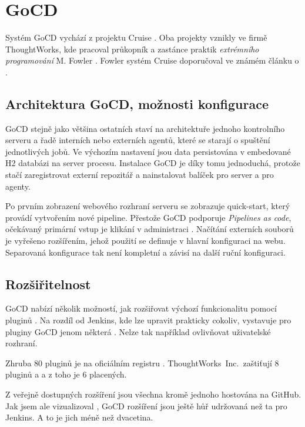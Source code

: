 \section{GoCD}
    Systém GoCD vychází z projektu Cruise \cite{thoughtworks-gocd}. Oba projekty vznikly ve firmě ThoughtWorks, kde pracoval průkopník a zastánce praktik \textit{extrémního programování} M. Fowler \cite{fowler-go}. Fowler systém Cruise doporučoval ve známém článku o \CI \cite{fowler-ci}.

    \subsection{Architektura GoCD, možnosti konfigurace}
        GoCD stejně jako většina ostatních \CI staví na architektuře jednoho kontrolního serveru a řadě interních nebo externích agentů, které se starají o spuštění jednotlivých jobů. Ve výchozím nastavení jsou data persistována v embedované H2 databázi na server procesu. Instalace GoCD je díky tomu jednoduchá, protože stačí zaregistrovat externí repozitář a nainstalovat balíček pro server a pro agenty.

        Po prvním zobrazení webového rozhraní serveru se zobrazuje quick-start, který provádí vytvořením nové pipeline. Přestože GoCD podporuje \textit{Pipelines as code}, očekávaný primární vstup je klikání v administraci \cite{gocd-pas}. Načítání externích souborů je vyřešeno rozšířením, jehož použití se definuje v hlavní  konfiguraci na webu. Separovaná konfigurace tak není kompletní a závisí na další ruční konfiguraci.

    \subsection{Rozšiřitelnost}
        GoCD nabízí několik možností, jak rozšiřovat výchozí funkcionalitu pomocí pluginů \cite{gocd-extensions}. Na rozdíl od Jenkins, kde lze upravit prakticky cokoliv, vystavuje pro pluginy GoCD jenom některá . Nelze tak například ovlivňovat uživatelské rozhraní.

        Zhruba 80 pluginů je na oficiálním registru \cite{gocd-plugins}. ThoughtWorks~Inc.~zaštiťují 8 pluginů a a z toho je 6 placených.

        Z veřejně dostupných rozšíření jsou všechna kromě jednoho hostována na GitHub. Jak jsem ale vizualizoval , GoCD rozšíření jsou ještě hůř udržovaná než ta pro Jenkins. A to je jich méně než dvacetina.

